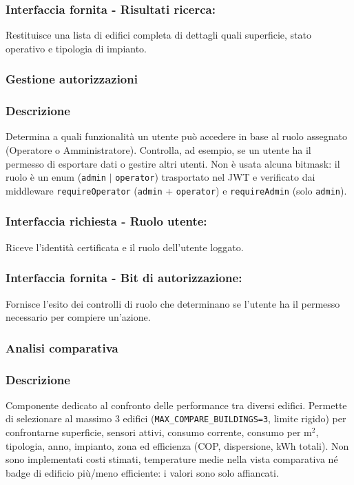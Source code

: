         \subsubsection*{Interfaccia fornita - Risultati ricerca:}
            Restituisce una lista di edifici completa di dettagli quali superficie, stato operativo e tipologia di impianto.

    \subsubsection{Gestione autorizzazioni}
        \subsubsection*{Descrizione}
            Determina a quali funzionalità un utente può accedere in base al ruolo assegnato (Operatore o Amministratore). Controlla, ad esempio, se un utente ha il permesso di esportare dati o gestire altri utenti. Non \`e usata alcuna bitmask: il ruolo \`e un enum (\texttt{admin} $|$ \texttt{operator}) trasportato nel JWT e verificato dai middleware \texttt{requireOperator} (\texttt{admin} + \texttt{operator}) e \texttt{requireAdmin} (solo \texttt{admin}).
        \subsubsection*{Interfaccia richiesta - Ruolo utente:}
            Riceve l'identità certificata e il ruolo dell'utente loggato.
        \subsubsection*{Interfaccia fornita - Bit di autorizzazione:}
            Fornisce l'esito dei controlli di ruolo che determinano se l'utente ha il permesso necessario per compiere un'azione.

    \subsubsection{Analisi comparativa}
        \subsubsection*{Descrizione}
            Componente dedicato al confronto delle performance tra diversi edifici. Permette di selezionare al massimo 3 edifici (\texttt{MAX\_COMPARE\_BUILDINGS=3}, limite rigido) per confrontarne superficie, sensori attivi, consumo corrente, consumo per m$^2$, tipologia, anno, impianto, zona ed efficienza (COP, dispersione, kWh totali). Non sono implementati costi stimati, temperature medie nella vista comparativa n\'e badge di edificio pi\`u/meno efficiente: i valori sono solo affiancati.
